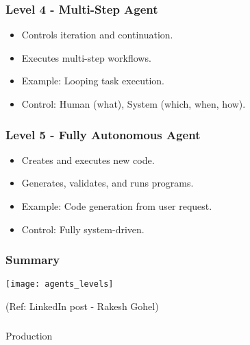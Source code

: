 \begin{frame}[fragile]\frametitle{Level 4 - Multi-Step Agent}
      \begin{itemize}
      \item Controls iteration and continuation.
      \item Executes multi-step workflows.
      \item Example: Looping task execution.
      \item Control: Human (what), System (which, when, how).
      \end{itemize}
\end{frame}

\begin{frame}[fragile]\frametitle{Level 5 - Fully Autonomous Agent}
      \begin{itemize}
      \item Creates and executes new code.
      \item Generates, validates, and runs programs.
      \item Example: Code generation from user request.
      \item Control: Fully system-driven.
      \end{itemize}
\end{frame}

\begin{frame}[fragile]\frametitle{Summary}

\begin{center}
\texttt{[image: agents\_levels]}
\end{center}	  

{\tiny (Ref: LinkedIn post - Rakesh Gohel)}

\end{frame}

\begin{frame}[fragile]\frametitle{}
\begin{center}
{\Large Production}
\end{center}
\end{frame}

